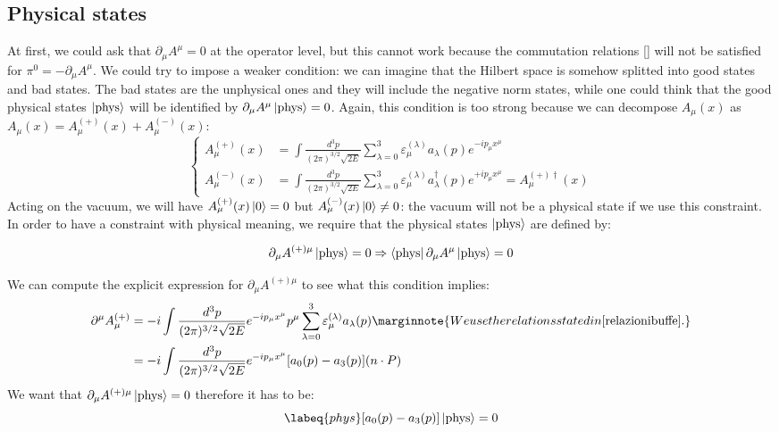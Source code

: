 \documentclass[../main.tex]{subfiles}
\begin{document}
\subsection{Physical states}
At first, we could ask that $\partial_\mu A^\mu=0$ at the operator level, but this cannot work because the commutation relations [] will not be satisfied for $\pi^0=-\partial_\mu A^\mu$. We could try to impose a weaker condition: we can imagine that the Hilbert space is somehow splitted into good states and bad states. The bad states are the unphysical ones and they will include the negative norm states, while one could think that the good physical states $\ket{\text{phys}}$ will be identified by $\partial_\mu A^\mu\ket{\text{phys}}=0$. Again, this condition is too strong because we can decompose $A_\mu(x)$ as $A_\mu(x)=A_\mu^{(+)}(x)+A_\mu^{(-)}(x)$:
\[
\left\{
\begin{aligned}
A_\mu^{(+)}(x)&=\int \frac{d^3p}{(2\pi)^{3/2}\sqrt{2E}}\sum_{\lambda=0}^3\varepsilon_\mu^{(\lambda)}a_\lambda(p)e^{-ip_\mu x^\mu}\\
A_\mu^{(-)}(x)&=\int \frac{d^3p}{(2\pi)^{3/2}\sqrt{2E}}\sum_{\lambda=0}^3\varepsilon_\mu^{(\lambda)}a^\dagger_\lambda(p)e^{+ip_\mu x^\mu}=A_\mu^{(+)\dagger}(x)
\end{aligned}
\right.
\]
Acting on the vacuum, we will have $A_\mu^{(+)}(x)\ket{0}=0$ but $A_\mu^{(-)}(x)\ket{0}\neq0$: the vacuum will not be a physical state if we use this constraint. In order to have a constraint with physical meaning, we require that the physical states $\ket{\text{phys}}$ are defined by:
\begin{kaobox}[frametitle=Gupta-Bleuler condition]
\[
\partial_\mu A^{(+)\mu}\ket{\text{phys}}=0\Rightarrow\bra{\text{phys}}\partial_\mu A^\mu\ket{\text{phys}}=0
\]
\end{kaobox}
We can compute the explicit expression for $\partial_\mu A^{(+)\mu}$ to see what this condition implies:
\begin{align*}
\partial^\mu A_\mu^{(+)}&=-i\int\frac{d^3p}{(2\pi)^{3/2}\sqrt{2E}}e^{-ip_\mu x^\mu}p^\mu\sum_{\lambda=0}^3\varepsilon_\mu^{(\lambda)}a_\lambda(p)\marginnote{We use the relations stated in \refeq{relazionibuffe}.}\\
&=-i\int\frac{d^3p}{(2\pi)^{3/2}\sqrt{2E}}e^{-ip_\mu x^\mu}[a_0(p)-a_3(p)](n \cdot P)
\end{align*}
We want that $\partial_\mu A^{(+)\mu}\ket{\text{phys}}=0$ therefore it has to be:
\begin{equation}
\labeq{phys}
[a_0(p)-a_3(p)]\ket{\text{phys}}=0
\end{equation}
\end{document}

